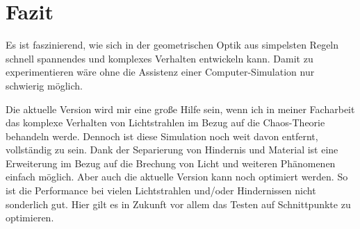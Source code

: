 \chapter{Fazit}
Es ist faszinierend, wie sich in der geometrischen Optik aus simpelsten Regeln schnell spannendes und komplexes Verhalten entwickeln kann.
Damit zu experimentieren wäre ohne die Assistenz einer Computer-Simulation nur schwierig möglich. 

Die aktuelle Version wird mir eine große Hilfe sein, wenn ich in meiner Facharbeit 
das komplexe Verhalten von Lichtstrahlen im Bezug auf die Chaos-Theorie behandeln werde.
Dennoch ist diese Simulation noch weit davon entfernt, vollständig zu sein. 
Dank der Separierung von Hindernis und Material ist eine Erweiterung im Bezug auf die Brechung von Licht und weiteren Phänomenen einfach möglich.
Aber auch die aktuelle Version kann noch optimiert werden. So ist die Performance bei vielen Lichtstrahlen und/oder Hindernissen nicht sonderlich gut.
Hier gilt es in Zukunft vor allem das Testen auf Schnittpunkte zu optimieren. 